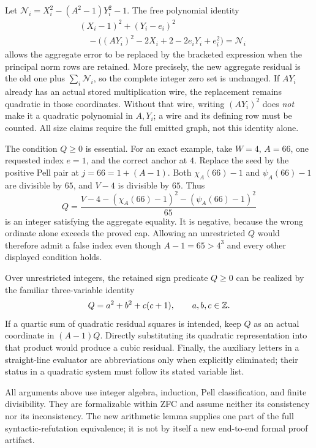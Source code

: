 \begin{remark}
Let $\mathcal N_i=X_i^2-(A^2-1)Y_i^2-1$.  The free polynomial identity
\begin{align*}
 &(X_i-1)^2+(Y_i-e_i)^2\\
 &\quad-\bigl((AY_i)^2-2X_i+2-2e_iY_i+e_i^2\bigr)
 =\mathcal N_i
\end{align*}
allows the aggregate error to be replaced by the bracketed expression
when the principal norm rows are retained.  More precisely, the new
aggregate residual is the old one plus $\sum_i\mathcal N_i$, so the
complete integer zero set is unchanged.  If $AY_i$ already has an
actual stored multiplication wire, the replacement remains quadratic
in those coordinates.  Without that wire, writing $(AY_i)^2$ does
\emph{not} make it a quadratic polynomial in $A,Y_i$; a wire and its
defining row must be counted.  All size claims require the full emitted
graph, not this identity alone.
\end{remark}

The condition $Q\ge0$ is essential.  For an exact example, take
$W=4$, $A=66$, one requested index $e=1$, and the correct anchor at $4$.
Replace the seed by the positive Pell pair at $j=66=1+(A-1)$.
Both $\chi_A(66)-1$ and $\psi_A(66)-1$ are divisible by $65$,
and $V-4$ is divisible by $65$.  Thus
\[
 Q=\frac{V-4-(\chi_A(66)-1)^2-(\psi_A(66)-1)^2}{65}
\]
is an integer satisfying the aggregate equality.  It is negative,
because the wrong ordinate alone exceeds the proved cap.  Allowing an
unrestricted $Q$ would therefore admit a false index even though
$A-1=65>4^3$ and every other displayed condition holds.

Over unrestricted integers, the retained sign predicate $Q\ge0$ can
be realized by the familiar three-variable identity
\[
 Q=a^2+b^2+c(c+1),\qquad a,b,c\in\mathbb Z.
\]
If a quartic sum of quadratic residual squares is intended, keep $Q$
as an actual coordinate in $(A-1)Q$.  Directly substituting its
quadratic representation into that product would produce a cubic
residual.  Finally, the auxiliary letters in a straight-line evaluator
are abbreviations only when explicitly eliminated; their status in a
quadratic system must follow its stated variable list.

All arguments above use integer algebra, induction, Pell classification,
and finite divisibility.  They are formalizable within ZFC and assume
neither its consistency nor its inconsistency.  The new arithmetic
lemma supplies one part of the full syntactic-refutation equivalence;
it is not by itself a new end-to-end formal proof artifact.
